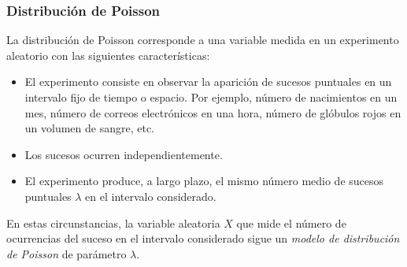 \begin{frame}
\frametitle{Distribución de Poisson}
La distribución de Poisson corresponde a una variable medida en un experimento aleatorio con las siguientes características:
\begin{itemize}
\item El experimento consiste en observar la aparición de sucesos puntuales en un intervalo fijo de tiempo o espacio. 
Por ejemplo, número de nacimientos en un mes, número de correos electrónicos en una hora, número de glóbulos rojos en un volumen de sangre, etc. 
\item Los sucesos ocurren independientemente.
\item El experimento produce, a largo plazo, el mismo número medio de sucesos puntuales $\lambda$ en el intervalo considerado.
\end{itemize}
En estas circunstancias, la variable aleatoria $X$ que mide el número de ocurrencias del suceso en el intervalo considerado sigue un \emph{modelo de distribución de Poisson} de parámetro $\lambda$.

\end{frame}


